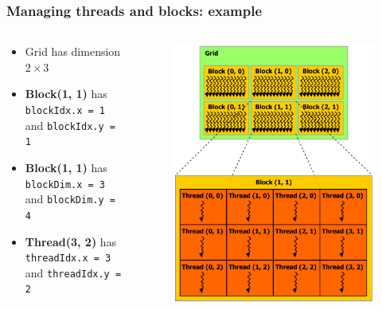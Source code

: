 \documentclass[10pt, aspectratio=1610]{beamer}
\begin{document}
\begin{frame}
  \frametitle{Managing threads and blocks: example}

  \begin{columns}
    \begin{column}{0.7\textwidth}
      \begin{itemize}
        \item Grid has dimension $2 \times 3$
        \item \textbf{Block(1, 1)} has \lstinline{blockIdx.x = 1} and \lstinline{blockIdx.y = 1}
        \item \textbf{Block(1, 1)} has \lstinline{blockDim.x = 3} and \lstinline{blockDim.y = 4}
        \item \textbf{Thread(3, 2)} has \lstinline{threadIdx.x = 3} and \lstinline{threadIdx.y = 2}
      \end{itemize}
    \end{column}
    \begin{column}{0.25\textwidth}
      \begin{figure}
        \centering
        \includegraphics[width=\textwidth, height=0.8\textheight, keepaspectratio]{./img/block-thread.pdf}
      \end{figure}
    \end{column}
  \end{columns}

\end{frame}
\end{document}
